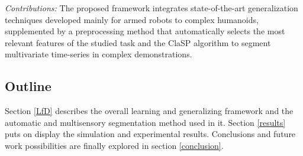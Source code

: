 \documentclass[a4paper, 10pt, conference]{ieeeconf}
\begin{document}

\textit{Contributions:} 
The proposed framework integrates state-of-the-art generalization techniques developed mainly for armed robots to complex humanoids, supplemented by a preprocessing method that automatically selects the most relevant features of the studied task and the ClaSP \cite{clasp} algorithm to segment multivariate time-series in complex demonstrations.

\subsection{Outline}

Section \ref{LfD} describes the overall learning and generalizing framework and the automatic and multisensory segmentation method used in it. Section \ref{results} puts on display the simulation and experimental results. Conclusions and future work possibilities are finally explored in section \ref{conclusion}.




\end{document}
